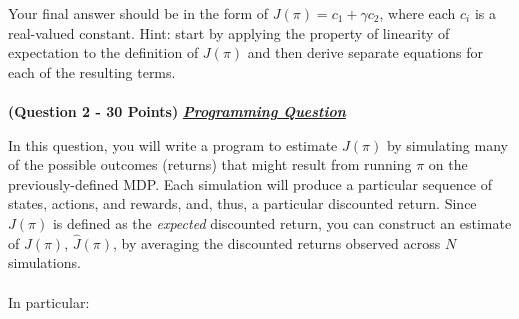 \documentclass{article}
\begin{document}
Your final answer should be in the form of $J(\pi) = c_1 + \gamma c_2$, where each $c_i$ is a real-valued constant. Hint: start by applying the property of linearity of expectation to the definition of $J(\pi)$ and then derive separate equations for each of the resulting terms.
\\ \\
\textbf{(Question 2 - 30 Points)} \underline{\textbf{\textit{Programming Question}}}

\vspace{0.3cm}

In this question, you will write a program to estimate $J(\pi)$ by simulating many of the possible outcomes (returns) that might result from running $\pi$ on the previously-defined MDP. Each simulation will produce a particular sequence of states, actions, and rewards, and, thus, a particular discounted return. Since $J(\pi)$ is defined as the \textit{expected} discounted return, you can construct an estimate of $J(\pi)$, $\hat{J}(\pi)$, by averaging the discounted returns observed across $N$ simulations.
\\ \\ 
In particular:
\end{document}
